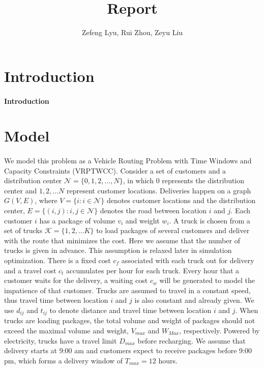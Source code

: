 \documentclass[12pt]{article}
\title{Report}
\author{Zefeng Lyu, Rui Zhou, Zeyu Liu}
\date{}
\numberwithin{equation}{section}
\begin{document}
\maketitle

\section{Introduction}

	\paragraph{Introduction}

\section{Model}
	
	\paragraph{}We model this problem as a Vehicle Routing Problem with Time Windows and Capacity Constraints (VRPTWCC)\parencite{Schneider2016}.  Consider a set of customers and a distribution center $\mathcal{N}=\{0,1,2,..., N\}$, in which 0 represents the distribution center and $1,2,...N$ represent customer locations. Deliveries happen on a graph $G(V, E)$, where $V=\{i: i\in \mathcal{N}\}$ denotes customer locations and the distribution center, $E=\{(i,j):i,j\in \mathcal{N}\}$ denotes the road between location $i$ and $j$.  Each customer $i$ has a package of volume $v_i$ and weight $w_i$. A truck is chosen from a set of trucks $\mathcal{K}=\{1,2,...K\}$ to load packages of several customers and deliver with the route that minimizes the cost. Here we assume that the number of trucks is given in advance. This assumption is relaxed later in simulation optimization. There is a fixed cost $c_f$ associated with each truck out for delivery and a travel cost $c_t$ accumulates per hour for each truck. Every hour that a customer waits for the delivery, a waiting cost $c_w$ will be generated to model the impatience of that customer. Trucks are assumed to travel in a constant speed, thus travel time between location $i$ and $j$ is also constant and already given. We use $d_{ij}$ and $t_{ij}$ to denote distance and travel time between location $i$ and $j$. When trucks are loading packages, the total volume and weight of packages should not exceed the maximal volume and weight, $V_{max}$ and $W_{Max}$, respectively. Powered by electricity, trucks have a travel limit $D_{max}$ before recharging. We assume that delivery starts at 9:00 am and customers expect to receive packages before 9:00 pm, which forms a delivery window of $T_{max}=12$ hours.
	
\end{document}
